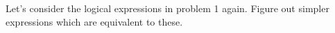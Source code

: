 Let's consider the logical expressions in problem 1 again. Figure out simpler expressions which are equivalent to these.